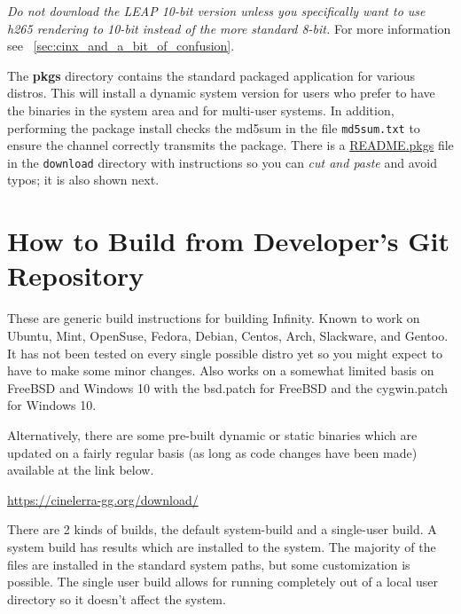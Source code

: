 \emph{Do not download the LEAP 10-bit version unless you specifically want to
use h265 rendering to 10-bit instead of the more standard 8-bit.} For more
information see ~\ref{sec:cinx_and_a_bit_of_confusion}.

The \textbf{pkgs} directory contains the standard packaged
application for various distros.  This will install a dynamic
system version for users who prefer to have the binaries in the
system area and for multi-user systems.
%
In addition, performing the package install checks the md5sum in
the file \texttt{md5sum.txt} to ensure the channel correctly
transmits the package.  There is a
\href{https://cinelerra-gg.org/download/README.pkgs}{README.pkgs}
file in the \texttt{download} directory with instructions so you
can \textit{cut and paste} and avoid typos; it is also shown
next.

\lstset{inputpath=extra/}


\section{How to Build \CGG{} from Developer's Git Repository}%
\label{sec:How_to_build}

These are generic build instructions for building \CGG{} Infinity.
Known to work on Ubuntu, Mint, OpenSuse, Fedora, Debian, Centos,
Arch, Slackware, and Gentoo.  It has not been tested on every
single possible distro yet so you might expect to have to make
some minor changes.  Also works on a somewhat limited basis on
FreeBSD and Windows 10 with the bsd.patch for FreeBSD and the
cygwin.patch for Windows 10.

Alternatively, there are some pre-built dynamic or static binaries
which are updated on a fairly regular basis (as long as code changes
have been made) available at the link below.
\begin{center}
  \href{https://cinelerra-gg.org/download/}{https://cinelerra-gg.org/download/}
\end{center}

There are 2 kinds of builds, the default system-build and a
single-user build.  A system build has results which are installed
to the system.  The majority of the files are installed in the
standard system paths, but some customization is possible.  The
single user build allows for running completely out of a local
user directory so it doesn't affect the system.

